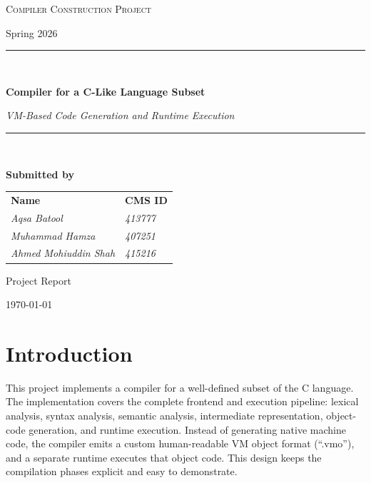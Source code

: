 \documentclass[11pt,a4paper]{article}
\begin{document}
\begin{titlepage}
    \centering
    \vspace*{2cm}

    {\scshape\LARGE Compiler Construction Project \par}
    \vspace{0.5cm}
    {\large Spring 2026\par}

    \vspace{2.2cm}
    \rule{\linewidth}{0.5pt}\\[0.6cm]
    {\huge\bfseries Compiler for a C-Like Language Subset\par}
    \vspace{0.3cm}
    {\Large\itshape VM-Based Code Generation and Runtime Execution\par}
    \rule{\linewidth}{0.5pt}\\[1.5cm]

    \vspace{1.2cm}
    {\large\bfseries Submitted by\par}
    \vspace{0.6cm}

    \begin{tabular}{ll}
        \textbf{Name} & \textbf{CMS ID} \\
        \rule{0pt}{14pt}\textit{Aqsa Batool} & \textit{413777} \\
        \rule{0pt}{14pt}\textit{Muhammad Hamza} & \textit{407251} \\
        \rule{0pt}{14pt}\textit{Ahmed Mohiuddin Shah} & \textit{415216}
    \end{tabular}

    \vfill

    {\large Project Report\par}
    {\large \today\par}
\end{titlepage}

\tableofcontents
\newpage

\section{Introduction}

This project implements a compiler for a well-defined subset of the C language.
The implementation covers the complete frontend and execution pipeline: lexical
analysis, syntax analysis, semantic analysis, intermediate representation,
object-code generation, and runtime execution. Instead of generating native
machine code, the compiler emits a custom human-readable VM object format
(``.vmo''), and a separate runtime executes that object code. This design keeps
the compilation phases explicit and easy to demonstrate.
\end{document}
